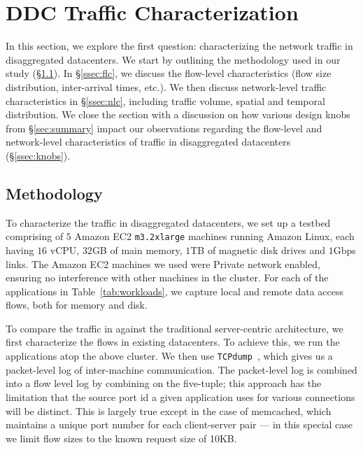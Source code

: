 \section{DDC Traffic Characterization}
\label{sec:workloads}
In this section, we explore the first question: characterizing the network traffic in disaggregated datacenters. We start by outlining the methodology used in our study (\S\ref{ssec:method1}). In \S\ref{ssec:flc}, we discuss the flow-level characteristics (flow size distribution, inter-arrival times, etc.). We then discuss network-level traffic characteristics in \S\ref{ssec:nlc}, including traffic volume, spatial and temporal distribution. We close the section with a discussion on how various design knobs from \S\ref{sec:summary} impact our observations regarding the flow-level and network-level characteristics of traffic in disaggregated datacenters (\S\ref{ssec:knobs}).

\subsection{Methodology}
\label{ssec:method1} 
To characterize the traffic in disaggregated datacenters, we set up a testbed comprising of $5$ Amazon EC2 \texttt{m3.2xlarge} machines running Amazon Linux, each having $16$ vCPU, $32$GB of main memory, $1$TB of magnetic disk drives and $1$Gbps links. The Amazon EC2 machines we used were Private network enabled, ensuring no interference with other machines in the cluster. For each of the applications in Table~\ref{tab:workloads}, we capture local and remote data access flows, both for memory and disk.

To compare the traffic in \dis against the traditional server-centric architecture, we first characterize the flows in existing datacenters. To achieve this, we run the applications atop the above cluster. We then use {\tt TCPdump}~\cite{tcpdump}, which gives us a packet-level log of inter-machine communication. The packet-level log is combined into a flow level log by combining on the five-tuple; this approach has the limitation that the source port id a given application uses for various connections will be distinct. This is largely true except in the case of memcached, which maintains a unique port number for each client-server pair --- in this special case we limit flow sizes to the known request size of 10KB.

